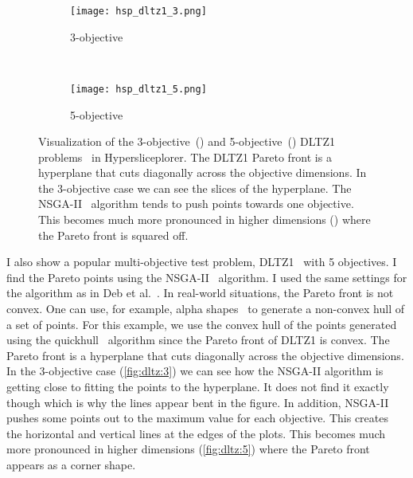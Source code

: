 \begin{figure} 
  \centering
  \begin{subfigure}[b]{0.45\linewidth}
    \texttt{[image: hsp\_dltz1\_3.png]}
    \caption{3-objective}
    \label{fig:dltz:3}
  \end{subfigure}
  ~
  \begin{subfigure}[b]{0.45\linewidth}
    \texttt{[image: hsp\_dltz1\_5.png]}
    \caption{5-objective}
    \label{fig:dltz:5}
  \end{subfigure}
  \caption[Visualization of the 3-objective and 5-objective DLTZ1 problems in Hypersliceplorer.]{%
    Visualization of the 3-objective~() and 
    5-objective~() DLTZ1 problems~\cite{Deb:2002a} in
    Hypersliceplorer. The DLTZ1 Pareto front is a hyperplane that cuts 
    diagonally across the objective dimensions. In the 3-objective case we 
    can see the slices of the hyperplane. The NSGA-II~\cite{Deb:2002} 
    algorithm tends to push points towards one objective. This becomes much
    more pronounced in higher dimensions () where the
    Pareto front is squared off.
  }
  \label{fig:dltz} 
\end{figure}

I also show a popular multi-objective test problem, DLTZ1~\cite{Deb:2002a}
with 5 objectives.  I find the Pareto points using the NSGA-II~\cite{Deb:2002}
algorithm.  I used the same settings for the algorithm as in Deb et 
al.~\cite{Deb:2002a}. In real-world situations, the Pareto front is not
convex. One can use, for example, alpha shapes~\cite{Edelsbrunner:1983} to
generate a non-convex hull of a set of points. For this example, we use the
convex hull of the points generated using the quickhull~\cite{Barber:1996}
algorithm since the Pareto front of DLTZ1 is convex.  The Pareto front is a
hyperplane that cuts diagonally across the objective dimensions. In the
3-objective case (\autoref{fig:dltz:3}) we can see how the NSGA-II algorithm is 
getting close to fitting the points to the hyperplane. It does not find it
exactly though which is why the lines appear bent in the figure. In addition,
NSGA-II pushes some points out to the maximum value for each objective.
This creates the horizontal and vertical lines at the edges of the plots.
This becomes much more pronounced in higher dimensions (\autoref{fig:dltz:5})
where the Pareto front appears as a corner shape.

